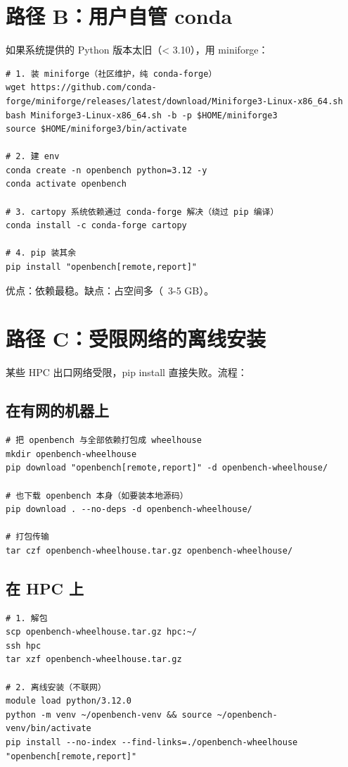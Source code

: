 \section{路径 B：用户自管 conda}

如果系统提供的 Python 版本太旧（< 3.10），用 miniforge：

\begin{verbatim}
# 1. 装 miniforge（社区维护，纯 conda-forge）
wget https://github.com/conda-forge/miniforge/releases/latest/download/Miniforge3-Linux-x86_64.sh
bash Miniforge3-Linux-x86_64.sh -b -p $HOME/miniforge3
source $HOME/miniforge3/bin/activate

# 2. 建 env
conda create -n openbench python=3.12 -y
conda activate openbench

# 3. cartopy 系统依赖通过 conda-forge 解决（绕过 pip 编译）
conda install -c conda-forge cartopy

# 4. pip 装其余
pip install "openbench[remote,report]"
\end{verbatim}

优点：依赖最稳。缺点：占空间多（~3-5 GB）。

\section{路径 C：受限网络的离线安装}

某些 HPC 出口网络受限，pip install 直接失败。流程：

\subsection{在有网的机器上}

\begin{verbatim}
# 把 openbench 与全部依赖打包成 wheelhouse
mkdir openbench-wheelhouse
pip download "openbench[remote,report]" -d openbench-wheelhouse/

# 也下载 openbench 本身（如要装本地源码）
pip download . --no-deps -d openbench-wheelhouse/

# 打包传输
tar czf openbench-wheelhouse.tar.gz openbench-wheelhouse/
\end{verbatim}

\subsection{在 HPC 上}

\begin{verbatim}
# 1. 解包
scp openbench-wheelhouse.tar.gz hpc:~/
ssh hpc
tar xzf openbench-wheelhouse.tar.gz

# 2. 离线安装（不联网）
module load python/3.12.0
python -m venv ~/openbench-venv && source ~/openbench-venv/bin/activate
pip install --no-index --find-links=./openbench-wheelhouse "openbench[remote,report]"
\end{verbatim}

